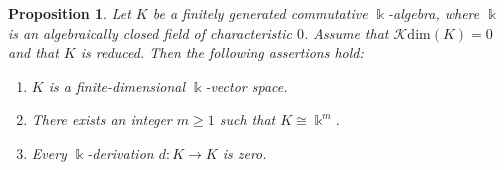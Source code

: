 \documentclass{amsart}
\newtheorem{proposition}[theorem]{Proposition}
\theoremstyle{definition}
\theoremstyle{remark}
\numberwithin{equation}{section}
\begin{document}
\begin{proposition}\label{Krull0}
Let $K$ be a finitely generated commutative $\Bbbk$-algebra, where $\Bbbk$ is an algebraically closed field of characteristic $0$. Assume that $\mathcal{K}\mathrm{dim}(K)=0$ and that $K$ is reduced. Then the following assertions hold:
\begin{enumerate}
    \item [\rm (1)] $K$ is a finite-dimensional $\Bbbk$-vector space.
    
    \item [\rm (2)] There exists an integer $m\geq 1$ such that $K\cong \Bbbk^m$. 

    \item [\rm (3)] Every $\Bbbk$-derivation $d:K\to K$ is zero.
\end{enumerate}
\end{proposition}
\end{document}
